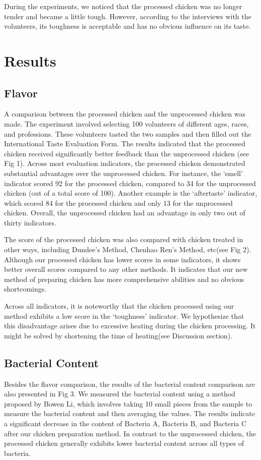 \documentclass[a4paper,12pt]{article}
\begin{document}
    During the experiments, we noticed that the processed chicken was no longer tender and became a little tough. However, according to the interviews with the volunteers, its toughness is acceptable and has no obvious influence on its taste.
	\section{Results}
    \subsection*{Flavor}
    A comparison between the processed chicken and the unprocessed chicken was made. The experiment involved selecting 100 volunteers of different ages, races, and professions. These volunteers tasted the two samples and then filled out the International Taste Evaluation Form\cite{fjh}. The results indicated that the processed chicken received significantly better feedback than the unprocessed chicken (see Fig 1). Across most evaluation indicators, the processed chicken demonstrated substantial advantages over the unprocessed chicken. For instance, the ‘smell’ indicator scored 92 for the processed chicken, compared to 34 for the unprocessed chicken (out of a total score of 100). Another example is the ‘aftertaste’ indicator, which scored 84 for the processed chicken and only 13 for the unprocessed chicken. Overall, the unprocessed chicken had an advantage in only two out of thirty indicators.

    The score of the processed chicken was also compared with chicken treated in other ways, including Dundee's Method\cite{dundee}, Chenhao Ren's Method\cite{rch}, etc(see Fig 2). Although our processed chicken has lower scores in some indicators, it shows better overall scores compared to any other methods. It indicates that our new method of preparing chicken has more comprehensive abilities and no obvious shortcomings.

    Across all indicators, it is noteworthy that the chicken processed using our method exhibits a low score in the ‘toughness’ indicator. We hypothesize that this disadvantage arises due to excessive heating during the chicken processing. It might be solved by shortening the time of heating(see Discussion section).
    
    \subsection*{Bacterial Content}
    Besides the flavor comparison, the results of the bacterial content comparison are also presented in Fig 3. We measured the bacterial content using a method proposed by Bowen Li\cite{lbw}, which involves taking 10 small pieces from the sample to measure the bacterial content and then averaging the values. The results indicate a significant decrease in the content of Bacteria A, Bacteria B, and Bacteria C after our chicken preparation method. In contrast to the unprocessed chicken, the processed chicken generally exhibits lower bacterial content across all types of bacteria. 
    
\end{document}
